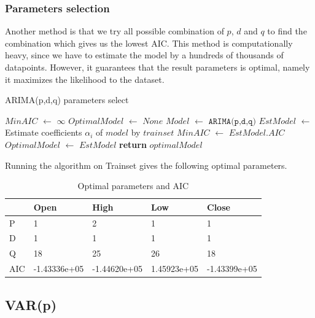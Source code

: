\documentclass[11pt]{article}
\begin{document}
\subsubsection{Parameters selection}
Another method is that we try all possible combination of $p$, $d$ and $q$ to
find the combination which gives us the lowest AIC. This method is
computationally heavy, since we have to estimate the model by a hundreds of
thousands of datapoints. However, it guarantees that the result parameters is
optimal, namely it maximizes the likelihood to the dataset.
\begin{algorithm}[H]
\caption{ARIMA(p,d,q) parameters select}\label{paramsselect1}
\begin{algorithmic}[1]
  \State $MinAIC$ $\gets$ $\infty$
  \State $OptimalModel$ $\gets$ $None$
  \State $Model$ $\gets$ $\texttt{ARIMA(p,d,q)}$
  \State $EstModel$ $\gets$ Estimate coefficients $\alpha_i$ of $model$ by $trainset$
  \State $MinAIC$ $\gets$ $EstModel.AIC$
  \State $OptimalModel$ $\gets$ $EstModel$
  \EndIf
  \EndFor
  \EndFor
  \EndFor
  \State \textbf{return} $optimalModel$
\EndProcedure
\end{algorithmic}
\end{algorithm}
Running the algorithm on Trainset gives the following optimal parameters.
\begin{table}[H]
  \centering 
\begin{tabular}{|l|l|l|l|l|}
  \hline
                   & Open        & High       & Low        & Close      \\ \hline
  P                & 1           & 2          & 1          & 1          \\ \hline
  D                & 1           & 1          & 1          & 1          \\ \hline
  Q                & 18          & 25         & 26         & 18         \\ \hline
  AIC              & -1.43336e+05   & -1.44620e+05  & 1.45923e+05 & -1.43399e+05    \\ \hline
\end{tabular}
\caption{Optimal parameters and AIC}
\end{table}

\subsection{VAR(p)}
\end{document}
